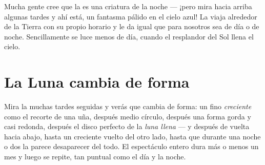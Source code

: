 \begin{remark}\label{rem:g2:moon-in-the-sky:daytime}
Mucha gente cree que la  es una criatura de la noche --- ¡pero
mira hacia arriba algunas tardes y ahí está, un fantasma pálido en el
cielo azul! La  viaja alrededor de la Tierra con su propio
horario y le da igual que para nosotros sea de día o de noche.
Sencillamente se luce menos de día, cuando el resplandor del Sol llena
el cielo.
\end{remark}

\section{La Luna cambia de forma}

\begin{example}\label{ex:g2:moon-in-the-sky:shapes}
Mira la  muchas tardes seguidas y verás que cambia de forma: un
fino \emph{creciente} como el recorte de una uña,
después medio círculo, después una forma gorda y casi redonda, después
el disco perfecto de la \emph{luna llena} --- y
después de vuelta hacia abajo, hasta un creciente vuelto del otro
lado, hasta que durante una noche o dos la  parece desaparecer
del todo. El espectáculo entero dura más o menos un mes y luego se
repite, tan puntual como el día y la noche.
\end{example}

